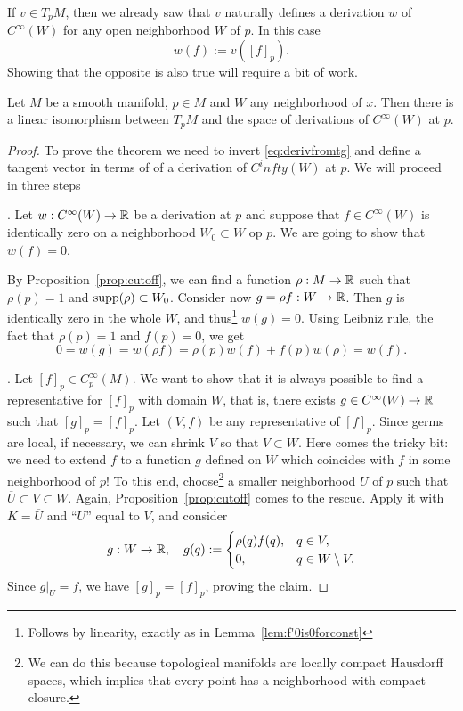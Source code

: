 If $v\in T_p M$, then we already saw that $v$ naturally defines a derivation $w$ of $C^\infty(W)$ for any open neighborhood $W$ of $p$.
In this case
\begin{equation}\label{eq:derivfromtg}
    w(f) := v([f]_p).
\end{equation}
Showing that the opposite is also true will require a bit of work.

\begin{prop}
    Let $M$ be a smooth manifold, $p\in M$ and $W$ any neighborhood of $x$.
    Then there is a linear isomorphism between $T_p M$ and the space of derivations of $C^\infty(W)$ at $p$.
\end{prop}
\begin{proof}
    To prove the theorem we need to invert \eqref{eq:derivfromtg} and define a tangent vector in terms of of a derivation of $C^infty(W)$ at $p$.
    We will proceed in three steps

    . Let $w:C^\infty(W) \to\mathbb{R}$ be a derivation at $p$ and suppose that $f\in C^\infty(W)$ is identically zero on a neighborhood $W_0\subset W$ op $p$. We are going to show that $w(f)=0$.

    By Proposition~\ref{prop:cutoff}, we can find a function $\rho:M\to\mathbb{R}$ such that $\rho(p)=1$ and $\operatorname{supp}(\rho) \subset W_0$. Consider now $g = \rho f : W \to \mathbb{R}$. Then $g$ is identically zero in the whole $W$, and thus\footnote{Follows by linearity, exactly as in Lemma~\ref{lem:f'0is0forconst}} $w(g) = 0$. Using Leibniz rule, the fact that $\rho(p)=1$ and $f(p) = 0$, we get
    \begin{equation}
        0 = w(g) = w(\rho f) = \rho(p) w(f) + f(p)w(\rho) = w(f).
    \end{equation}

    .
    Let $[f]_p\in C_p^\infty(M)$.
    We want to show that it is always possible to find a representative for $[f]_p$ with domain $W$, that is, there exists $g\in C^\infty(W)\to\mathbb{R}$ such that $[g]_p = [f]_p$.
    Let $(V, f)$ be any representative of $[f]_p$.
    Since germs are local, if necessary, we can shrink $V$ so that $V\subset W$.
    Here comes the tricky bit: we need to extend $f$ to a function $g$ defined on $W$ which coincides with $f$ in some neighborhood of $p$!
    To this end, choose\footnote{We can do this because topological manifolds are locally compact Hausdorff spaces, which implies that every point has a neighborhood with compact closure.} a smaller neighborhood $U$ of $p$ such that $\overline{U}\subset V\subset W$.
    Again, Proposition~\ref{prop:cutoff} comes to the rescue. Apply it with $K=\overline{U}$ and ``$U$'' equal to $V$, and consider
    \begin{equation}
        g:W\to\mathbb{R}, \quad
        g(q) := \begin{cases}
            \rho(q)f(q), & q\in V,\\
            0, & q \in W\setminus V.
        \end{cases}
    \end{equation}
    Since $g|_U = f$, we have $[g]_p = [f]_p$, proving the claim.


\end{proof}
